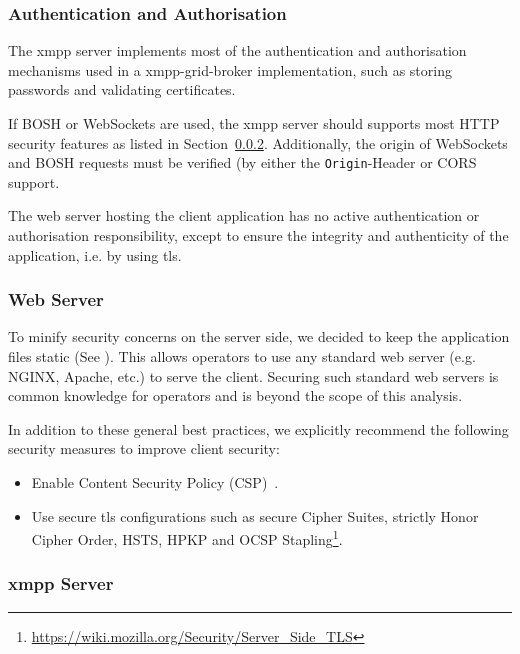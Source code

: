 \subsubsection{Authentication and Authorisation}

The \gls{xmpp} server implements most of the authentication and authorisation mechanisms used in a \gls{xmpp-grid-broker} implementation, such as storing passwords and validating certificates.

If BOSH or WebSockets are used, the \gls{xmpp} server should supports most HTTP security features as listed in Section~\ref{sec:web-server}. Additionally, the origin of WebSockets and BOSH requests must be verified (by either the \texttt{Origin}-Header or CORS support.~\cite{rfc6455}\cite{cross-origin-resource-sharing}

The web server hosting the client application has no active authentication or authorisation responsibility, except to ensure the integrity and authenticity of the application, i.e. by using \gls{tls}.

\subsubsection{Web Server}\label{sec:web-server}

To minify security concerns on the server side, we decided to keep the application files static (See ).
This allows operators to use any standard web server (e.g. NGINX, Apache, etc.) to serve the client.
Securing such standard web servers is common knowledge for operators and is beyond the scope of this analysis.

In addition to these general best practices, we explicitly recommend the following security measures to improve client security:

\begin{itemize}
    \item Enable Content Security Policy (CSP)~\cite{w3c-csp}.
    \item Use secure \gls{tls} configurations such as secure Cipher Suites, strictly Honor Cipher Order, HSTS, HPKP and OCSP Stapling\footnote{\url{https://wiki.mozilla.org/Security/Server_Side_TLS}}.
\end{itemize}


\subsubsection{\gls{xmpp} Server}

